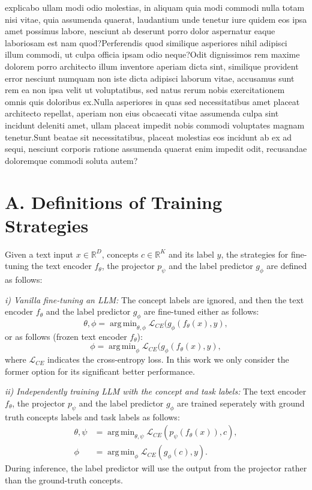 \documentclass[letterpaper]{article} %
\DeclareMathOperator*{\argmin}{arg\,min}
\begin{document}
explicabo ullam modi odio molestias, in aliquam quia modi commodi nulla totam nisi vitae, quia assumenda quaerat, laudantium unde tenetur iure quidem eos ipsa amet possimus labore, nesciunt ab deserunt porro dolor aspernatur eaque laboriosam est nam quod?Perferendis quod similique asperiores nihil adipisci illum commodi, ut culpa officia ipsam odio neque?Odit dignissimos rem maxime dolorem porro architecto illum inventore aperiam dicta sint, similique provident error nesciunt numquam non iste dicta adipisci laborum vitae, accusamus sunt rem ea non ipsa velit ut voluptatibus, sed natus rerum nobis exercitationem omnis quis doloribus ex.Nulla asperiores in quas sed necessitatibus amet placeat architecto repellat, aperiam non eius obcaecati vitae assumenda culpa sint incidunt deleniti amet, ullam placeat impedit nobis commodi voluptates magnam tenetur.Sunt beatae sit necessitatibus, placeat molestias eos incidunt ab ex ad sequi, nesciunt corporis ratione assumenda quaerat enim impedit odit, recusandae doloremque commodi soluta autem?\clearpage

\section{A. Definitions of Training Strategies}
\label{app:def}

Given a text input $x \in \mathbb{R}^D$, concepts $c\in \mathbb{R}^K$ and its label $y$, the strategies for fine-tuning the text encoder $f_\theta$, the projector $p_\psi$ and the label predictor $g_\phi$ are defined as follows:

\noindent\textit{i) Vanilla fine-tuning an LLM:} The concept labels are ignored, and then the text encoder $f_\theta$ and the label predictor $g_\phi$ are fine-tuned either as follows:
\begin{equation*}
    \theta, \phi = \argmin_{\theta, \phi} \mathcal{L}_{CE} (g_\phi(f_\theta(x), y),
\end{equation*}
or as follows (frozen text encoder $f_\theta$):
\begin{equation*}
    \phi = \argmin_{\phi} \mathcal{L}_{CE} (g_\phi(f_\theta(x), y),
\end{equation*}
where $\mathcal{L}_{CE}$ indicates the cross-entropy loss. In this work we only consider the former option for its significant better performance.

\noindent\textit{ii) Independently training LLM with the concept and task labels:} The text encoder $f_\theta$, the projector $p_\psi$ and the label predictor $g_\phi$ are trained seperately with ground truth concepts labels and task labels as follows:
\begin{equation*}
    \begin{aligned}
    \theta, \psi &= \argmin_{\theta, \psi} \mathcal{L}_{CE} (p_\psi(f_\theta(x)),c), \\
    \phi &= \argmin_{\phi} \mathcal{L}_{CE} (g_{\phi}(c),y).
    \end{aligned}
\end{equation*}
During inference, the label predictor will use the output from the projector rather than the ground-truth concepts.
\end{document}
